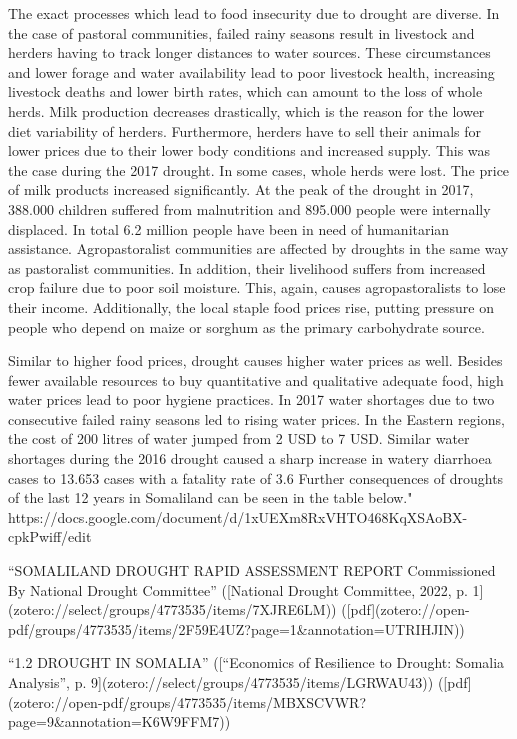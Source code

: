 {{The exact processes which lead to food insecurity due to drought are diverse. In the case of pastoral communities, failed rainy seasons result in livestock and herders having to track longer distances to water sources. These circumstances and lower forage and water availability lead to poor livestock health, increasing livestock deaths and lower birth rates, which can amount to the loss of whole herds. Milk production decreases drastically, which is the reason for the lower diet variability of herders. Furthermore, herders have to sell their animals for lower prices due to their lower body conditions and increased supply. This was the case during the 2017 drought. In some cases, whole herds were lost. The price of milk products increased significantly. At the peak of the drought in 2017, 388.000 children suffered from malnutrition and 895.000 people were internally displaced. In total 6.2 million people have been in need of humanitarian assistance.
Agropastoralist communities are affected by droughts in the same way as pastoralist communities. In addition, their livelihood suffers from increased crop failure due to poor soil moisture. This, again, causes agropastoralists to lose their income. Additionally, the local staple food prices rise, putting pressure on people who depend on maize or sorghum as the primary carbohydrate source. 

Similar to higher food prices, drought causes higher water prices as well. Besides fewer available resources to buy quantitative and qualitative adequate food, high water prices lead to poor hygiene practices. In 2017 water shortages due to two consecutive failed rainy seasons led to rising water prices. In the Eastern regions, the cost of 200 litres of water jumped from 2 USD to 7 USD. Similar water shortages during the 2016 drought caused a sharp increase in watery diarrhoea cases to 13.653 cases with a fatality rate of 3.6 %
Further consequences of droughts of the last 12 years in Somaliland can be seen in the table below."
https://docs.google.com/document/d/1xUEXm8RxVHTO468KqXSAoBX-cpkPwiff/edit

“SOMALILAND DROUGHT RAPID ASSESSMENT REPORT Commissioned By National Drought Committee” ([National Drought Committee, 2022, p. 1](zotero://select/groups/4773535/items/7XJRE6LM)) ([pdf](zotero://open-pdf/groups/4773535/items/2F59E4UZ?page=1&annotation=UTRIHJIN))



“1.2 DROUGHT IN SOMALIA” ([“Economics of Resilience to Drought: Somalia Analysis”, p. 9](zotero://select/groups/4773535/items/LGRWAU43)) ([pdf](zotero://open-pdf/groups/4773535/items/MBXSCVWR?page=9&annotation=K6W9FFM7))

}}
